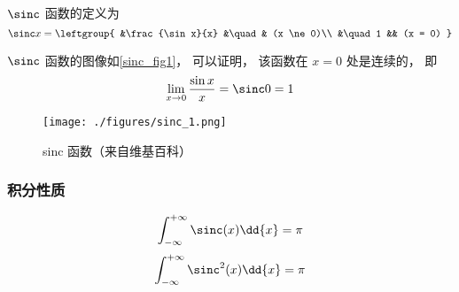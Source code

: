 

$\sinc$ 函数的定义为
\begin{equation}
\sinc x = 
\leftgroup{
&\frac{\sin x}{x} &\quad & (x \ne 0)\\
&\quad 1 && (x = 0)
}\end{equation}

$\sinc$ 函数的图像如\autoref{sinc_fig1}， 可以证明， 该函数在 $x=0$ 处是连续的， 即
\begin{equation}
\lim_{x \to 0}\frac{\sin x}{x} = \sinc 0 = 1
\end{equation}

\begin{figure}[ht]
\centering
\texttt{[image: ./figures/sinc\_1.png]}
\caption{sinc 函数（来自维基百科）} \label{sinc_fig1}
\end{figure}

\subsubsection{积分性质}
\begin{equation}\label{sinc_eq2}
\int_{-\infty}^{+\infty} \sinc(x) \dd{x} = \pi
\end{equation}
\begin{equation}\label{sinc_eq1}
\int_{-\infty}^{+\infty} \sinc^2(x) \dd{x} = \pi
\end{equation}
